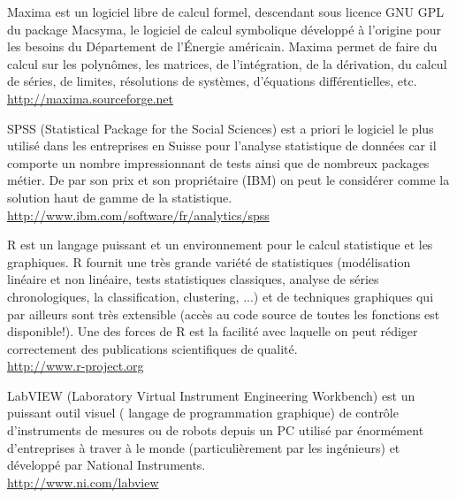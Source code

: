 	{\Large {}}{\Large {}} Maxima est un logiciel libre de calcul formel, descendant sous licence GNU GPL du package Macsyma, le logiciel de calcul symbolique développé à l'origine pour les besoins du Département de l'Énergie américain. Maxima permet de faire du calcul sur les polynômes, les matrices, de l'intégration, de la dérivation, du calcul de séries, de limites, résolutions de systèmes, d'équations différentielles, etc.\\
	\href{http://maxima.sourceforge.net}{\color{blue}http://maxima.sourceforge.net}
	
	{\Large {}}{\Large {}} SPSS (Statistical Package for the Social Sciences) est a priori le logiciel le plus utilisé dans les entreprises en Suisse pour l'analyse statistique de données car il comporte un nombre impressionnant de tests ainsi que de nombreux packages métier. De par son prix et son propriétaire (IBM) on peut le considérer comme la solution haut de gamme de la statistique.\\
	\href{http://www.ibm.com/software/fr/analytics/spss}{\color{blue}http://www.ibm.com/software/fr/analytics/spss}
	
	{\Large {}}{\Large {}}{\Large {}} R est un langage puissant et un environnement pour le calcul statistique et les graphiques. R fournit une très grande variété de statistiques (modélisation linéaire et non linéaire, tests statistiques classiques, analyse de séries chronologiques, la classification, clustering, ...) et de techniques graphiques qui par ailleurs sont très extensible (accès au code source de toutes les fonctions est disponible!). Une des forces de R est la facilité avec laquelle on peut rédiger correctement des publications scientifiques de qualité.\\
	\href{http://www.r-project.org}{\color{blue}http://www.r-project.org}
	
	{\Large {}}{\Large {}} LabVIEW (Laboratory Virtual Instrument Engineering Workbench) est un puissant outil visuel ( langage de programmation graphique) de contrôle d'instruments de mesures ou de robots depuis un PC utilisé par énormément d'entreprises à traver à le monde (particulièrement par les ingénieurs) et développé par National Instruments.\\
	\href{http://www.ni.com/labview}{\color{blue}http://www.ni.com/labview}
	
